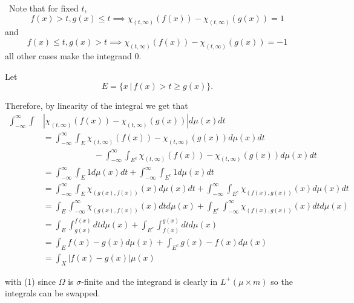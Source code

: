 \documentclass[12pt]{Qual}
\begin{document}
\begin{solution}$\,$
Note that for fixed $t$, $$f(x)>t,g(x)\le t\implies \chi_{(t,\infty)}(f(x))-\chi_{(t,\infty)}(g(x))=1$$ and $$f(x)\le t,g(x)>t\implies \chi_{(t,\infty)}(f(x))-\chi_{(t,\infty)}(g(x))=-1$$ all other cases make the integrand $0$.

Let $$E=\{x\,|\, f(x)>t\ge g(x)\}.$$

Therefore, by linearity of the integral we get that
\begin{align*}
    \int_{-\infty}^\infty\int&\left|\chi_{(t,\infty)}(f(x))-\chi_{(t,\infty)}(g(x))\right|d\mu(x)dt\\
    &=\int_{-\infty}^\infty\int_E\chi_{(t,\infty)}(f(x))-\chi_{(t,\infty)}(g(x))d\mu(x)dt\\
    &\qquad\qquad\qquad-\int_{-\infty}^\infty\int_{E^c}\chi_{(t,\infty)}(f(x))-\chi_{(t,\infty)}(g(x))d\mu(x)dt\\
    &=\int_{-\infty}^\infty\int_E1d\mu(x)dt+\int_{-\infty}^\infty\int_{E^c}1d\mu(x)dt\\
    &=\int_{-\infty}^\infty\int_E\chi_{(g(x),f(x))}(x)d\mu(x)dt+\int_{-\infty}^\infty\int_{E^c}\chi_{(f(x),g(x))}(x)d\mu(x)dt\\
    &=\int_E\int_{-\infty}^\infty\chi_{(g(x),f(x))}(x)dtd\mu(x)+\int_{E^c}\int_{-\infty}^\infty\chi_{(f(x),g(x))}(x)dtd\mu(x)\\
    &=\int_E\int_{g(x)}^{f(x)}dtd\mu(x)+\int_{E^c}\int_{f(x)}^{g(x)}dtd\mu(x)\\
    &=\int_Ef(x)-g(x)d\mu(x)+\int_{E^c}g(x)-f(x)d\mu(x)\\
    &=\int_X|f(x)-g(x)|\mu(x)
\end{align*}

with (1) since $\Omega$ is $\sigma$-finite and the integrand is clearly in $L^+(\mu\times m)$ so the integrals can be swapped.
\end{solution}
\vspace{0.5cm}
\end{document}
